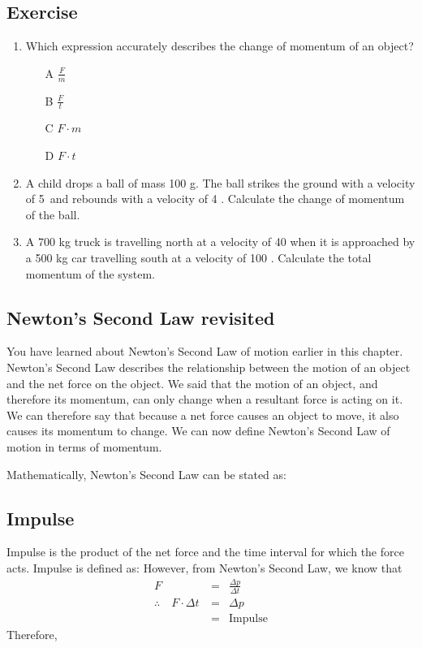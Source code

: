 \subsection{Exercise}
\begin{enumerate}
\item {Which expression accurately describes the change of momentum of an object?
\begin{enumerate}
\item [A] $\frac{F}{m}$
\item [B] $\frac{F}{t}$
\item [C] $F \cdot m$
\item [D] $F \cdot t$
\end{enumerate}}
\item A child drops a ball of mass 100 g. The ball strikes the ground with a velocity of 5~\ms and rebounds with a velocity of 4 \ms. Calculate the change of momentum of the ball.
\item A 700 kg truck is travelling north at a velocity of 40 \kph when it is approached by a 500 kg car travelling south at a velocity of 100 \kph. Calculate the total momentum of the system.
\end{enumerate}

\subsection{Newton's Second Law revisited}
You have learned about Newton's Second Law of motion earlier in this chapter. 
Newton's Second Law describes the relationship between the motion of an object and the net force on the object. We said that the motion of an object, and therefore its momentum, can only change when a resultant force is acting on it. We can therefore say that because a net force causes an object to move, it also causes its momentum to change. We can now define Newton's Second Law of motion in terms of momentum.\\


Mathematically, Newton's Second Law can be stated as:

\subsection{Impulse}
Impulse is the product of the net force and the time interval for which the force acts. Impulse is defined as:
However, from Newton's Second Law, we know that
\begin{eqnarray*}
F&=&\frac{\Delta p}{\Delta t}\\
\therefore\quad F \cdot \Delta t\ &=& \Delta p\\
&=&\mathrm{Impulse}
\end{eqnarray*}
Therefore,

